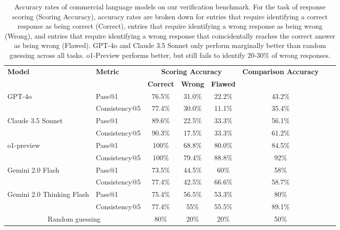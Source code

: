 \begin{table}[htbp]
\centering
\begin{tabular}{llcccccc}
\toprule
\textbf{Model} & \textbf{Metric} & \multicolumn{3}{c}{\textbf{Scoring Accuracy}} & \multicolumn{1}{c}{\textbf{Comparison Accuracy}} \\
\cmidrule(lr){3-5} \cmidrule(lr){6-6}
 &  & \textbf{Correct} & \textbf{Wrong} & \textbf{Flawed} &  \\
\midrule
\multirow{2}{*}{GPT-4o} & Pass@1    & 76.5\%  & 31.0\% & 22.2\% & 43.2\%\\
 & Consistency@5 & 77.4\% & 30.0\% & 11.1\% & 35.4\% \\
\midrule
\multirow{2}{*}{Claude 3.5 Sonnet} & Pass@1 & 89.6\% & 22.5\% & 33.3\% & 56.1\% \\
 & Consistency@5 & 90.3\% & 17.5\% & 33.3\% & 61.2\% \\
\midrule
\multirow{2}{*}{o1-preview} & Pass@1 & 100\% & 68.8\% & 80.0\% & 84.5\% \\
 & Consistency@5 & 100\% & 79.4\% & 88.8\% & 92\% \\
\midrule
\multirow{2}{*}{Gemini 2.0 Flash} & Pass@1 & 73.5\% & 44.5\% & 60\% & 58\%  \\
 & Consistency@5 & 77.4\% & 42.5\% & 66.6\% & 58.7\% \\
\midrule
\multirow{2}{*}{Gemini 2.0 Thinking Flash} & Pass@1 & 75.4\% & 56.5\% & 53.3\%  & 80\%  \\
 & Consistency@5 & 77.4\%  & 55\% & 55.5\%  & 89.1\% \\
\midrule
\multicolumn{2}{c}{Random guessing}  & 80\% & 20\% & 20\% & 50\% \\
\bottomrule
\end{tabular}
\caption{Accuracy rates of commercial language models on our verification benchmark. For the task of response scoring (Scoring Accuracy), accuracy rates are broken down for entries that require identifying a correct response as being correct (Correct), entries that require identifying a wrong response as being wrong (Wrong), and entries that require identifying a wrong response that coincidentally reaches the correct answer as being wrong (Flawed).
GPT-4o and Claude 3.5 Sonnet only perform marginally better than random guessing across all tasks. o1-Preview performs better, but still fails to identify 20-30\% of wrong responses.
}
\label{tab:benchmark}
\end{table}
